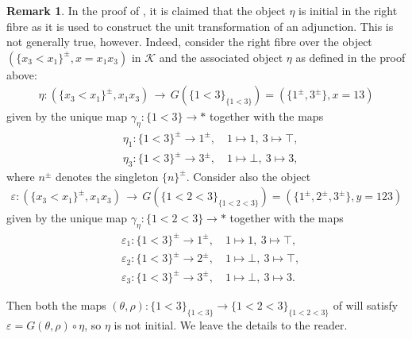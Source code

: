 \documentclass[12pt, reqno]{amsart}
\theoremstyle{plain}
\theoremstyle{definition}
\newtheorem{remark}[theorem]{Remark}
\renewcommand{\epsilon}{\varepsilon}
\begin{document}
\begin{remark}\label{eta not initial}
In the proof of \cite[Lemma 5.11]{Yuan}, it is claimed that the object $\eta$ is initial in the right fibre as it is used to construct the unit transformation of an adjunction. This is not generally true, however. Indeed, consider the right fibre over the object $(\{x_3<x_1\}^\pm,x=x_1x_3)$ in $\mathcal{K}$ and the associated object $\eta$ as defined in the proof above:
\begin{align*}
\eta\colon (\{x_3<x_1\}^\pm,x_1x_3)\,\longrightarrow\, G(\{1<3\}_{\{1<3\}})=(\{1^\pm, 3^\pm \}, x=13)
\end{align*}
given by the unique map $\gamma_\eta\colon \{1<3\}\rightarrow \ast$ together with the maps
\begin{align*}
&\eta_1\colon \{1<3\}^\pm \rightarrow 1^\pm, \quad 1\mapsto 1, \ 3\mapsto \top, \\
&\eta_3\colon \{1<3\}^\pm \rightarrow 3^\pm, \quad 1\mapsto \bot, \ 3\mapsto 3,
\end{align*}
where $n^\pm$ denotes the singleton $\{n\}^\pm$. Consider also the object
\begin{align*}
\epsilon\colon (\{x_3<x_1\}^\pm,x_1x_3)\,\longrightarrow\, G(\{1<2<3\}_{\{1<2<3\}})=(\{1^\pm, 2^\pm,  3^\pm \}, y=123)
\end{align*}
given by the unique map $\gamma_\eta\colon \{1<2<3\}\rightarrow \ast$ together with the maps
\begin{align*}
&\epsilon_1\colon \{1<3\}^\pm\rightarrow 1^\pm, \quad 1\mapsto 1, \ 3\mapsto \top, \\
&\epsilon_2\colon \{1<3\}^\pm\rightarrow 2^\pm, \quad 1\mapsto \bot, \ 3\mapsto \top, \\
&\epsilon_3\colon \{1<3\}^\pm\rightarrow 3^\pm, \quad 1\mapsto \bot, \ 3\mapsto 3.
\end{align*}

Then both the maps $(\theta,\rho)\colon \{1<3\}_{\{1<3\}}\rightarrow \{1<2<3\}_{\{1<2<3\}}$ of  will satisfy $\epsilon=G(\theta,\rho)\circ \eta$, so $\eta$ is not initial. We leave the details to the reader.


\end{remark}
\end{document}
